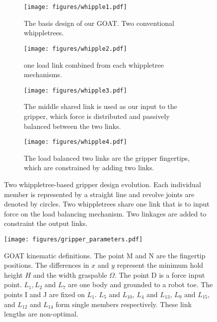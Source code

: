\documentclass[letterpaper, 10 pt, conference]{ieeeconf}  %
\begin{document}


 \begin{figure}
 \centering
    \begin{subfigure}{0.2\textwidth}
    
\texttt{[image: figures/whipple1.pdf]}
\caption{The basis design of our GOAT. Two conventional whippletrees.}
    \end{subfigure}
     \begin{subfigure}{0.2\textwidth}
         \centering
    \texttt{[image: figures/whipple2.pdf]}
    \caption{one load link combined from each whippletree mechanisms.}%
     \end{subfigure}
      \begin{subfigure}{0.2\textwidth}
    \centering
\texttt{[image: figures/whipple3.pdf]}
\caption{The middle shared link is used as our input to the gripper, which force is distributed and passively balanced between the two links.}
    \end{subfigure}
     \begin{subfigure}{0.2\textwidth}
         \centering
    \texttt{[image: figures/whipple4.pdf]}
    \caption{The load balanced two links are the gripper fingertips, which are constrained by adding two links.}
     \end{subfigure}
     \caption{Two whippletree-based gripper design evolution. Each individual member is represented by a straight line and revolve joints are denoted by circles. Two whippletrees share one link that is to input force on the load balancing mechanism. Two linkages are added to constraint the output links.
     }\label{fig:whipple_design}
\end{figure} 

\begin{figure}
    \centering
    \texttt{[image: figures/gripper\_parameters.pdf]}
    \caption{GOAT kinematic definitions. The point M and N are the fingertip positions. The differences in $x$ and $y$ represent the minimum hold height $H$ and the width graspable $\Omega$. The point D is a force input point. $L_1,L_2$ and $L_7$ are one body and grounded to a robot toe. The points I and J are fixed on $L_1$. $L_5$ and $L_{10}$, $L_4$ and $L_{13}$, $L_9$ and $L_{15}$, and $L_{12}$ and $L_{14}$ form single members respectively. These link lengths are non-optimal. }  
    \label{fig:gripper_parameters}
\end{figure}
\end{document}
